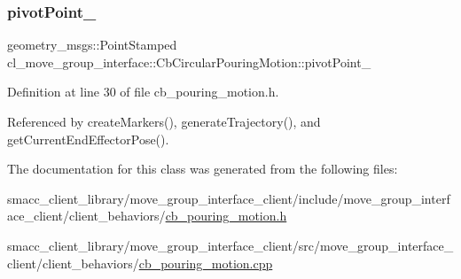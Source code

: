 \subsubsection{\texorpdfstring{pivot\+Point\+\_\+}{pivotPoint\_}}
{\footnotesize\ttfamily geometry\+\_\+msgs\+::\+Point\+Stamped cl\+\_\+move\+\_\+group\+\_\+interface\+::\+Cb\+Circular\+Pouring\+Motion\+::pivot\+Point\+\_\+\hspace{0.3cm}{\ttfamily [protected]}}



Definition at line 30 of file cb\+\_\+pouring\+\_\+motion.\+h.



Referenced by create\+Markers(), generate\+Trajectory(), and get\+Current\+End\+Effector\+Pose().



The documentation for this class was generated from the following files\+:\begin{DoxyCompactItemize}
\item 
smacc\+\_\+client\+\_\+library/move\+\_\+group\+\_\+interface\+\_\+client/include/move\+\_\+group\+\_\+interface\+\_\+client/client\+\_\+behaviors/\hyperlink{cb__pouring__motion_8h}{cb\+\_\+pouring\+\_\+motion.\+h}\item 
smacc\+\_\+client\+\_\+library/move\+\_\+group\+\_\+interface\+\_\+client/src/move\+\_\+group\+\_\+interface\+\_\+client/client\+\_\+behaviors/\hyperlink{cb__pouring__motion_8cpp}{cb\+\_\+pouring\+\_\+motion.\+cpp}\end{DoxyCompactItemize}

